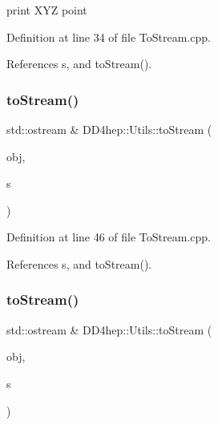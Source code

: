 print X\+YZ point 



Definition at line 34 of file To\+Stream.\+cpp.



References s, and to\+Stream().

\hypertarget{namespace_d_d4hep_1_1_utils_ad01ecddf10c1ce2ef7593b0a01516898}{}\label{namespace_d_d4hep_1_1_utils_ad01ecddf10c1ce2ef7593b0a01516898} 
\subsubsection{\texorpdfstring{to\+Stream()}{toStream()}\hspace{0.1cm}{\footnotesize\ttfamily [21/22]}}
{\footnotesize\ttfamily std\+::ostream \& D\+D4hep\+::\+Utils\+::to\+Stream (\begin{DoxyParamCaption}\item[{const R\+O\+O\+T\+::\+Math\+::\+X\+Y\+Z\+Vector \&}]{obj,  }\item[{std\+::ostream \&}]{s }\end{DoxyParamCaption})}



Definition at line 46 of file To\+Stream.\+cpp.



References s, and to\+Stream().

\hypertarget{namespace_d_d4hep_1_1_utils_aba37b7ad17a5c6c9f0db489d583ce2bc}{}\label{namespace_d_d4hep_1_1_utils_aba37b7ad17a5c6c9f0db489d583ce2bc} 
\subsubsection{\texorpdfstring{to\+Stream()}{toStream()}\hspace{0.1cm}{\footnotesize\ttfamily [22/22]}}
{\footnotesize\ttfamily std\+::ostream \& D\+D4hep\+::\+Utils\+::to\+Stream (\begin{DoxyParamCaption}\item[{const R\+O\+O\+T\+::\+Math\+::\+Px\+Py\+Pz\+E\+Vector \&}]{obj,  }\item[{std\+::ostream \&}]{s }\end{DoxyParamCaption})}



